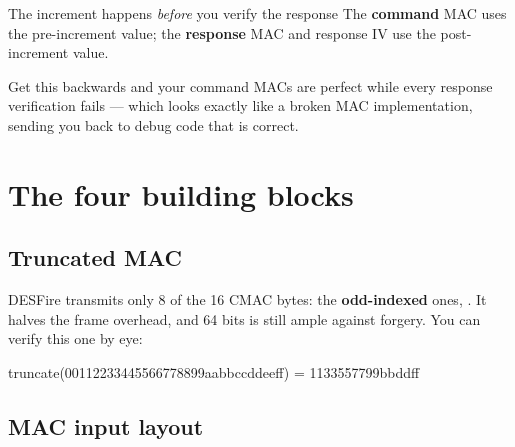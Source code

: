 \begin{center}
\end{center}

\begin{trap}{The increment happens \emph{before} you verify the response}
The \textbf{command} MAC uses the pre-increment value; the \textbf{response} MAC
and response IV use the post-increment value.

Get this backwards and your command MACs are perfect while every response
verification fails --- which looks exactly like a broken MAC implementation,
sending you back to debug code that is correct.
\end{trap}

\section{The four building blocks}

\subsection{Truncated MAC}

DESFire transmits only 8 of the 16 CMAC bytes: the \textbf{odd-indexed} ones,
. It halves the frame overhead, and 64 bits is
still ample against forgery. You can verify this one by eye:

\begin{trace}
truncate(00112233445566778899aabbccddeeff) = 1133557799bbddff
\end{trace}

\subsection{MAC input layout}

